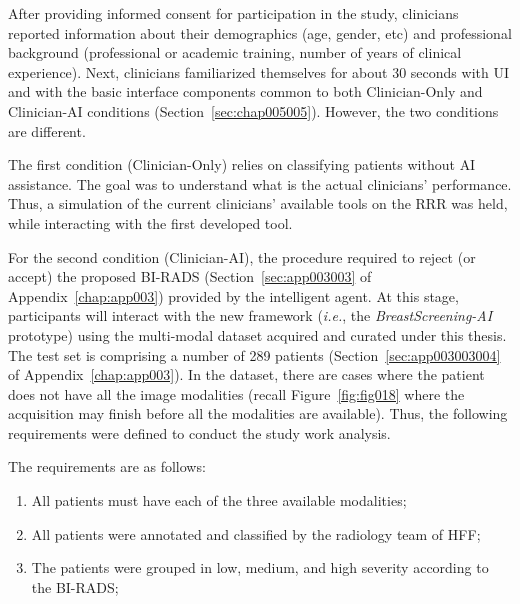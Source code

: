 After providing informed consent for participation in the study, clinicians reported information about their demographics (age, gender, etc) and professional background (professional or academic training, number of years of clinical experience).
Next, clinicians familiarized themselves for about 30 seconds with \ac{UI} and with the basic interface components common to both Clinician-Only and Clinician-AI conditions (Section~\ref{sec:chap005005}).
However, the two conditions are different.

The first condition (Clinician-Only) relies on classifying patients without \ac{AI} assistance.
The goal was to understand what is the actual clinicians' performance.
Thus, a simulation of the current clinicians' available tools on the \ac{RRR} was held, while interacting with the first developed tool.

For the second condition (Clinician-AI), the procedure required to reject (or accept) the proposed \ac{BI-RADS} (Section~\ref{sec:app003003} of Appendix~\ref{chap:app003}) provided by the intelligent agent.
At this stage, participants will interact with the new framework ({\it i.e.}, the {\it BreastScreening-AI} prototype) using the multi-modal dataset acquired and curated under this thesis.
The test set is comprising a number of 289 patients (Section~\ref{sec:app003003004} of Appendix~\ref{chap:app003}).
In the dataset, there are cases where the patient does not have all the image modalities (recall Figure~\ref{fig:fig018} where the acquisition may finish before all the modalities are available).
Thus, the following requirements were defined to conduct the study work analysis.

\vspace{2.00mm}

\noindent
The requirements are as follows:

\vspace{0.05mm}

\begin{enumerate}
\item All patients must have each of the three available modalities;
\item All patients were annotated and classified by the radiology team of \acs{HFF};
\item The patients were grouped in low, medium, and high severity according to the \ac{BI-RADS};
\end{enumerate}


